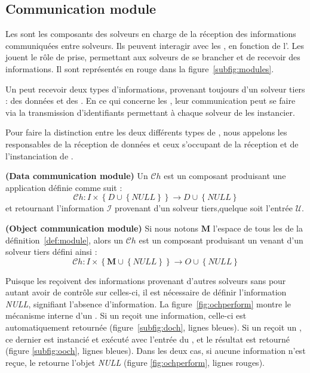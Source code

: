 \subsection{Communication module}

Les \opchs{} sont  les composants des solveurs en charge  de la réception des informations communiquées entre solveurs. Ils  peuvent interagir
avec les  \oms, en fonction de l'\as. Les \opchs{} jouent le rôle de prise, permettant aux solveurs de  se  brancher et  de recevoir  des informations. Il sont représentés en rouge dans la figure~\ref{subfig:modules}.

Un \opch{} peut recevoir deux types d'informations, provenant toujours d'un solveur tiers : des données et des \oms. En ce qui concerne les \oms, leur communication peut se faire via la  transmission d'identifiants permettant à chaque solveur de les instancier.

Pour faire la distinction entre  les deux différents types  de \opchs, nous appelons \INTROdopch{} les \opchs{} responsables de la réception de données  et \INTROoopch{} ceux s'occupant de la réception et de l'instanciation de \oms.

\begin{lemma} \label{def:dopench} \textbf{(Data communication module)}
Un \dopch{} $\mathcal{C}h$ est un composant produisant une application définie comme suit : 
\begin{equation}
\mathcal{C}h: I\times\left\{D\cup\left\{NULL\right\}\right\} \rightarrow D \cup \left\{NULL\right\}
\end{equation}
et retournant l'information  $\mathcal{I}$ provenant d'un solveur tiers,quelque soit l'entrée $\mathcal{U}$.
\end{lemma}

\begin{lemma}\label{def:oopench} \textbf{(Object communication module)} 
Si nous notons $\mathbf{M}$ l'espace  de  tous  les \oms{} de la définition~\ref{def:module}, alors un \oopch{} $\mathcal{C}h$ est  un composant produisant un \om{}  venant d'un solveur tiers défini ainsi :
\begin{equation}
\mathcal{C}h:I\times\left\{\mathbf{M}\cup\left\{NULL\right\}\right\} \rightarrow O\cup\left\{NULL\right\}
\end{equation}
\end{lemma}

Puisque les \opchs{} reçoivent des informations provenant  d'autres solveurs sans pour autant avoir de contrôle sur celles-ci, il est  nécessaire  de  définir   l'information  {\it  NULL}, signifiant l'absence  d'information. La  figure~\ref{fig:ochperform}  montre  le mécanisme interne d'un  \opch{}. Si un \dopch{} reçoit une information,  celle-ci est  automatiquement retournée (figure~\ref{subfig:doch}, lignes bleues). Si un \oopch{} reçoit un \om{}, ce dernier est instancié et exécuté avec l'entrée du \opch, et le résultat est retourné (figure \ref{subfig:ooch}, lignes bleues). Dans les deux  cas, si aucune information n'est reçue, le \opch{} retourne l'objet  {\it NULL}  (figure \ref{fig:ochperform}, lignes rouges).

